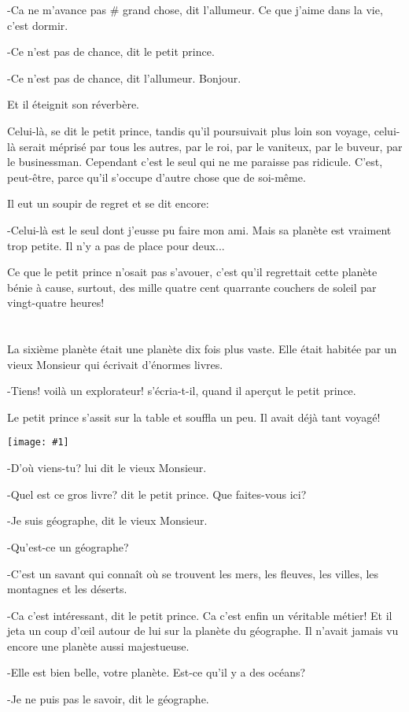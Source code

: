 \documentclass{report}
\newcommand{\parachapter}[2][]{\end{paracol}\chapter[#1]{#2}\begin{paracol}{2}}
\newcommand{\incpic}[1]{%
\end{paracol}
\begin{center}
    \texttt{[image: \#1]}
\end{center}
\begin{paracol}{2}}
\begin{document}
\begin{paracol}{2}
-Ca ne m'avance pas \# grand chose, dit l'allumeur. Ce que j'aime dans la vie, c'est dormir.

-Ce n'est pas de chance, dit le petit prince.

-Ce n'est pas de chance, dit l'allumeur. Bonjour.

Et il éteignit son réverbère.

Celui-là, se dit le petit prince, tandis qu'il poursuivait plus loin son voyage, celui-là serait méprisé par tous les autres, par le roi, par le vaniteux, par le buveur, par le businessman. Cependant c'est le seul qui ne me paraisse pas ridicule. C'est, peut-être, parce qu'il s'occupe d'autre chose que de soi-même.

Il eut un soupir de regret et se dit encore:

-Celui-là est le seul dont j'eusse pu faire mon ami. Mais sa planète est vraiment trop petite. Il n'y a pas de place pour deux...

Ce que le petit prince n'osait pas s'avouer, c'est qu'il regrettait cette planète bénie à cause, surtout, des mille quatre cent quarrante couchers de soleil par vingt-quatre heures!
\parachapter{} %

La sixième planète était une planète dix fois plus vaste. Elle était habitée par un vieux Monsieur qui écrivait d'énormes livres.

-Tiens! voilà un explorateur! s'écria-t-il, quand il aperçut le petit prince.

Le petit prince s'assit sur la table et souffla un peu. Il avait déjà tant voyagé!

\incpic{pic/image30.jpeg}

-D'où viens-tu? lui dit le vieux Monsieur.

-Quel est ce gros livre? dit le petit prince. Que faites-vous ici?

-Je suis géographe, dit le vieux Monsieur.

-Qu'est-ce un géographe?

-C'est un savant qui connaît où se trouvent les mers, les fleuves, les villes, les montagnes et les déserts.

-Ca c'est intéressant, dit le petit prince. Ca c'est enfin un véritable métier! Et il jeta un coup d'œil autour de lui sur la planète du géographe. Il n'avait jamais vu encore une planète aussi majestueuse.

-Elle est bien belle, votre planète. Est-ce qu'il y a des océans?

-Je ne puis pas le savoir, dit le géographe.


\end{paracol}
\end{document}
